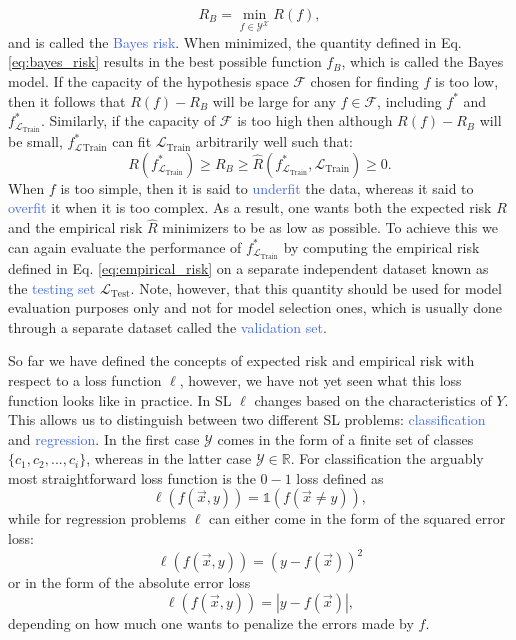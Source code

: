 \begin{equation}
	R_B = \underset{f\in\mathcal{Y}^{\mathcal{X}}}{\min} R(f),
	\label{eq:bayes_risk}
\end{equation}
and is called the \textcolor{RoyalBlue}{Bayes risk}. When minimized, the quantity defined in Eq. \ref{eq:bayes_risk} results in the best possible function $f_B$, which is called the Bayes model. If the capacity of the hypothesis space $\mathcal{F}$ chosen for finding $f$ is too low, then it follows that $R(f)-R_B$ will be large for any $f\in\mathcal{F}$, including $f^{*}$ and $f^{*}_{\mathcal{L}_{\text{Train}}}$. Similarly, if the capacity of $\mathcal{F}$ is too high then although $R(f)-R_B$ will be small, $f^{*}_\mathcal{L}_{\text{Train}}$ can fit 
$\mathcal{L}_{\text{Train}}$ arbitrarily well such that:
\begin{equation}
	R(f^{*}_{\mathcal{L}_{\text{Train}}}) \geq R_B \geq \hat{R}(f^{*}_{\mathcal{L}_{\text{Train}}},\mathcal{L}_{\text{Train}}) \geq 0.
\end{equation}
When $f$ is too simple, then it is said to \textcolor{RoyalBlue}{underfit} the data, whereas it said to \textcolor{RoyalBlue}{overfit} it when it is too complex. As a result, one wants both the expected risk $R$ and the empirical risk $\hat{R}$ minimizers to be as low as possible. To achieve this we can again evaluate the performance of $f^{*}_{\mathcal{L}_{\text{Train}}}$ by computing the empirical risk defined in Eq. \ref{eq:empirical_risk} on a separate independent dataset known as the \textcolor{RoyalBlue}{testing set} $\mathcal{L}_{\text{Test}}$. Note, however, that this quantity should be used for model evaluation purposes only and not for model selection ones, which is usually done through a separate dataset called the \textcolor{RoyalBlue}{validation set}. 

So far we have defined the concepts of expected risk and empirical risk with respect to a loss function $\ell$, however, we have not yet seen what this loss function looks like in practice. In SL $\ell$ changes based on the characteristics of $Y$. This allows us to distinguish between two different SL problems: \textcolor{RoyalBlue}{classification} and \textcolor{RoyalBlue}{regression}. In the first case $\mathcal{Y}$ comes in the form of a finite set of classes $\{c_1, c_2,...,c_i\}$, whereas in the latter case $\mathcal{Y}\in\mathds{R}$. For classification the arguably most straightforward loss function is the $0-1$ loss defined as 
\begin{equation}
	\ell(f(\vec{x},y)) = \mathbb{1}(f(\vec{x}\neq y)),
\end{equation}
while for regression problems $\ell$ can either come in the form of the squared error loss:
\begin{equation}
	\ell(f(\vec{x},y))=(y-f(\vec{x}))^2
\end{equation}
or in the form of the absolute error loss
\begin{equation}
	\ell(f(\vec{x},y))=|y-f(\vec{x})|,
\end{equation}
depending on how much one wants to penalize the errors made by $f$.

